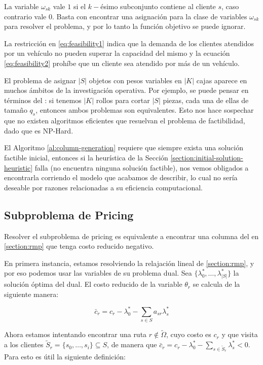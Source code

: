 La variable $\omega_{sk}$ vale $1$ si el $k-$ésimo subconjunto contiene al cliente $s$, caso contrario vale $0$. Basta con encontrar una asignación para la clase de variables $\omega_{sk}$ para resolver el problema, y por lo tanto la función objetivo se puede ignorar. 

La restricción en \ref{eq:feasibility1} indica que la demanda de los clientes atendidos por un vehículo no pueden superar la capacidad del mismo y la ecuación \ref{eq:feasibility2} prohíbe que un cliente sea atendido por más de un vehículo. 

El problema de asignar $|S|$ objetos con pesos variables en $|K|$ cajas aparece en muchos ámbitos de la investigación operativa. Por ejemplo, se puede pensar en términos del : si tenemos $|K|$ rollos para cortar $|S|$ piezas, cada una de ellas de tamaño $q_s$, entonces ambos problemas son equivalentes. Esto nos hace sospechar que no existen algoritmos eficientes que resuelvan el problema de factibilidad, dado que  es NP-Hard.

El Algoritmo \ref{al:column-generation} requiere que siempre exista una solución factible inicial, entonces si la heurística de la Sección \ref{section:initial-solution-heuristic} falla (no encuentra ninguna solución factible), nos vemos obligados a encontrarla corriendo el modelo que acabamos de describir, lo cual no sería deseable por razones relacionadas a su eficiencia computacional.


\subsection{Subproblema de Pricing}

Resolver el subproblema de pricing es equivalente a encontrar una columna del  en \ref{section:rmp} que tenga costo reducido negativo.

En primera instancia, estamos resolviendo la relajación lineal de \ref{section:rmp}, y por eso podemos usar las variables de su problema dual. Sea $\{\lambda^*_0, \dots, \lambda^*_{|S|}\}$ la solución óptima del dual. 
El costo reducido de la variable $\theta_r$ se calcula de la siguiente manera:

\begin{equation}
    \bar{c}_r = c_r - \lambda^*_0 - \sum_{s \in S}{a_{sr}\lambda^*_s} 
\end{equation}

Ahora estamos intentando encontrar una ruta $r \notin \tilde{\Omega}$, cuyo costo es $c_r$ y que visita a los clientes $\tilde{S}_r = \{s_0, \dots, s_i\} \subseteq S$, de manera que $\bar{c}_r = c_r - \lambda^*_0 - \sum_{s \in \tilde{S}_r}{\lambda^*_s} < 0$. Para esto es útil la siguiente definición:

